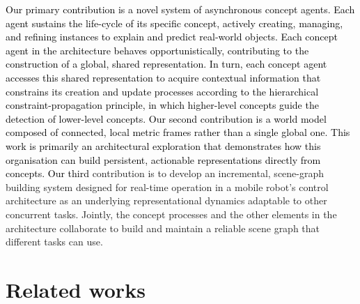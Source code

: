 \documentclass[10pt,a4paper]{article}
\begin{document}
%
%

\textcolor{black}{Our primary contribution is a novel system of asynchronous concept agents. Each agent sustains the life-cycle of its specific concept, actively creating, managing, and refining instances to explain and predict real-world objects. Each concept agent in the architecture behaves opportunistically, contributing to the construction of a global, shared representation. In turn, each concept \textcolor{black}{agent accesses this shared representation to acquire contextual information} that constrains its creation and update processes according to the hierarchical constraint-propagation principle, in which higher-level concepts guide the detection of lower-level concepts.} 
\textcolor{black}{Our second contribution is a world model composed of connected, local metric frames rather than a single global one. This work is primarily an architectural exploration that demonstrates how this organisation can build persistent, actionable representations directly from concepts.}
\textcolor{black}{Our third} contribution is to develop an incremental, scene-graph building system designed for real-time operation in a mobile robot's control architecture as an underlying representational dynamics adaptable to other concurrent tasks. Jointly, the concept processes and the other elements in the architecture collaborate to build and maintain a reliable scene graph that different tasks can use.

%

\section{Related works}
\end{document}
